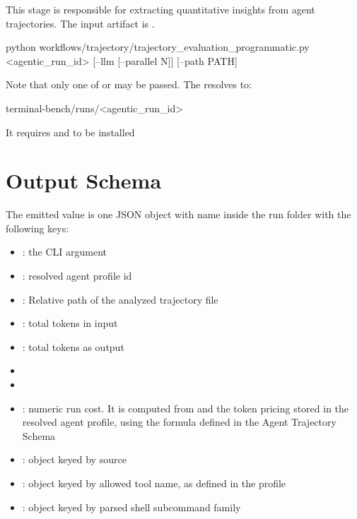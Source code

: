 \documentclass[11pt]{article}
\begin{document}
\label{docstart:agentic_trajectory_evaluation}
This stage is responsible for extracting quantitative insights from agent trajectories.
The input artifact is .

\begin{DocCode}
python workflows/trajectory/trajectory_evaluation_programmatic.py <agentic_run_id> [--llm [--parallel N]] [--path PATH]
\end{DocCode}
Note that only one of  or  may be passed.
The  resolves to:
\begin{DocCode}
terminal-bench/runs/<agentic_run_id>
\end{DocCode}

It requires  and  to be installed

\section*{Output Schema}

The emitted value is one JSON object with name  inside the run folder with the following keys:

\begin{itemize}
\item {}: the CLI argument
\item {}: resolved agent profile id
\item {}: Relative path of the analyzed trajectory file
\item {}: total tokens in input
\item {}: total tokens as output
\item {}
\item {}
\item {}: numeric run cost. It is computed from  and the token pricing stored in the resolved agent profile, using the formula defined in the Agent Trajectory Schema
\item {}: object keyed by source
\item {}: object keyed by allowed tool name, as defined in the  profile
\item {}: object keyed by parsed shell subcommand family
\end{itemize}
\end{document}
